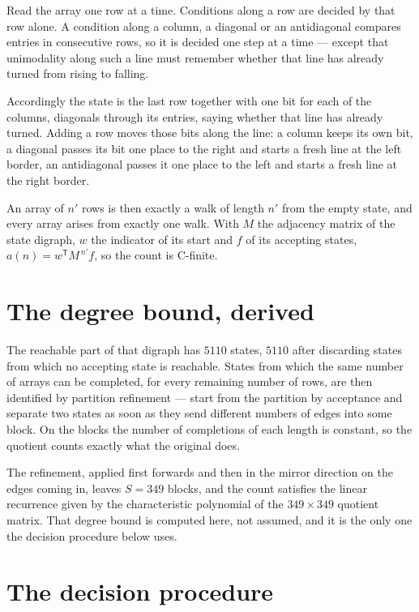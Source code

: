 \documentclass[11pt]{article}
\theoremstyle{definition}
\begin{document}
Read the array one row at a time. Conditions along a row are decided by that row alone. A condition along a column, a diagonal or an antidiagonal compares entries in consecutive rows, so it is decided one step at a time --- except that unimodality along such a line must remember whether that line has already turned from rising to falling.

Accordingly the state is the last row together with one bit for each of the columns, diagonals through its entries, saying whether that line has already turned. Adding a row moves those bits along the line: a column keeps its own bit, a diagonal passes its bit one place to the right and starts a fresh line at the left border, an antidiagonal passes it one place to the left and starts a fresh line at the right border.

An array of $n'$ rows is then exactly a walk of length $n'$ from the empty state, and every array arises from exactly one walk. With $M$ the adjacency matrix of the state digraph, $w$ the indicator of its start and $f$ of its accepting states, $a(n) = w^{\mathsf T}M^{\,n'}f$, so the count is C-finite.

\section{The degree bound, derived}

The reachable part of that digraph has $5110$ states, $5110$ after discarding states from which no accepting state is reachable. States from which the same number of arrays can be completed, for every remaining number of rows, are then identified by partition refinement --- start from the partition by acceptance and separate two states as soon as they send different numbers of edges into some block. On the blocks the number of completions of each length is constant, so the quotient counts exactly what the original does.

The refinement, applied first forwards and then in the mirror direction on the edges coming in, leaves $S = 349$ blocks, and the count satisfies the linear recurrence given by the characteristic polynomial of the $349 \times 349$ quotient matrix. That degree bound is computed here, not assumed, and it is the only one the decision procedure below uses.

\section{The decision procedure}
\end{document}
